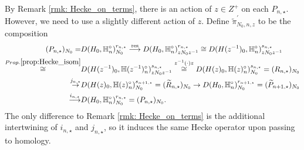 \documentclass[10pt]{amsart}
\begin{document}
By Remark \ref{rmk: Hecke_on_terms}, there is an action of $z\in Z^{+}$ on each $P_{n,\star}$. However, we need to use a slightly different action of $z$. Define $\tilde{\pi}_{N_{0},n,z}^{\prime}$ to be the composition \begin{equation}\begin{split}
    (P_{n,\star})_{N_{0}}  = & D(H_{0},\mathbb{H}_{n}^{\circ})^{r_{n,\star}}_{N_{0}}  \overset{\textnormal{res}}{\longrightarrow}  D(H_{0},\mathbb{H}_{n}^{\circ})^{r_{n,\star}}_{zN_{0}z^{-1}} \overset{}{\cong} D(H(z^{-1})_{0},\mathbb{H}_{n}^{\circ})^{s_{n,\star} }_{zN_{0}z^{-1}} \\
    \overset{Prop. \ref{prop:Hecke_isom}}{\cong} & D(H(z^{-1})_{0},\mathbb{H}(z^{-1})_{n}^{\circ})^{s_{n,\star} }_{zN_{0}z^{-1}} \overset{z^{-1}(\cdot)z}{\cong} D(H(z)_{0},\mathbb{H}(z)_{n}^{\circ})^{s_{n,\star} }_{N_{0}} = (R_{n,\star})_{N_{0}} \\
    \overset{j_{n,\star}}{\rightarrow} &  D(H(z)_{0},\mathbb{H}(z)_{n}^{\circ})^{s_{n+1,\star} }_{N_{0}} = (\widetilde{R}_{n,\star})_{N_{0}} \rightarrow D(H_{0},\mathbb{H}_{n}^{\circ})^{r_{n+1,\star}}_{N_{0}} = (\widetilde{P}_{n+1,\star})_{N_{0}} \\
    \overset{i_{n,\star}}{\longrightarrow } & D(H_{0},\mathbb{H}_{n}^{\circ})^{r_{n,\star}}_{N_{0}} = (P_{n,\star})_{N_{0}}. 
\end{split}\end{equation} The only difference to Remark \ref{rmk: Hecke_on_terms} is the additional intertwining of $i_{n,\star}$ and $j_{n,\star}$, so it induces the same Hecke operator upon passing to homology. 
\end{document}
